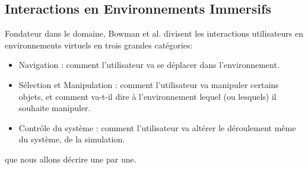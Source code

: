 	\subsection{Interactions en Environnements Immersifs}
	
	Fondateur dans le domaine, Bowman et al. \cite{bowman_introduction_2001} divisent les interactions utilisateurs en environnements virtuels en trois grandes catégories:
	\begin{itemize}
		\item Navigation : comment l'utilisateur va se déplacer dans l'environnement.
		\item Sélection et Manipulation : comment l'utilisateur va manipuler certains objets, et comment va-t-il dire à l'environnement lequel (ou lesquels) il souhaite manipuler.
		\item Contrôle du système : comment l'utilisateur va altérer le déroulement même du système, de la simulation.
	\end{itemize}
	que nous allons décrire une par une.
	
